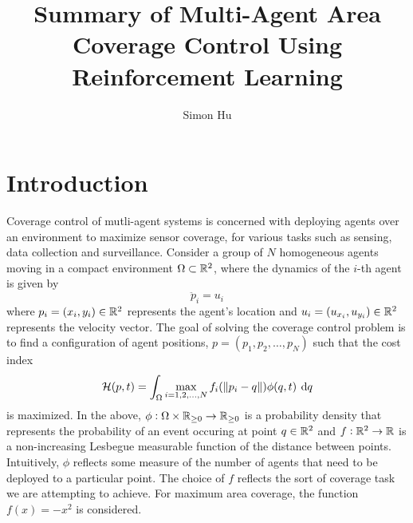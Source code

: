 \documentclass[11pt]{article}
\title{\bf\Large{Summary of Multi-Agent Area Coverage Control Using Reinforcement Learning}}
\author{Simon Hu}
\date{}
\begin{document}
\maketitle

\section{Introduction}
Coverage control of mutli-agent systems is concerned with deploying agents over an environment to maximize sensor coverage, for various tasks such as sensing, data collection and surveillance. Consider a group of $N$ homogeneous agents moving in a compact environment $\Omega \subset \mathbb{R}^2$, where the dynamics of the $i$-th agent is given by 
\begin{equation}
	\displaystyle \ddot{p}_i = u_i
\end{equation}
where $p_i = (x_i, y_i) \in \mathbb{R}^2$ represents the agent's location and $u_i = (u_{x_i}, u_{y_i}) \in \mathbb{R}^2$ represents the velocity vector. The goal of solving the coverage control problem is to find a configuration of agent positions, $p = (p_1, p_2, \dots, p_N)$ such that the cost index 
\begin{equation}
	\label{intro:cost index}
	\displaystyle \mathcal{H}(p,t) = \int_{\Omega}{\max\limits_{i=1,2,\dots,N}{f_i(\,\norm{p_i - q})} \phi(q, t) \: \dif q}
\end{equation}
is maximized. In the above, $\phi : \Omega \times \mathbb{R}_{\geq 0} \to \mathbb{R}_{\geq 0}$ is a probability density that represents the probability of an event occuring at point $q \in \mathbb{R}^2$ and $f : \mathbb{R}^2 \to \mathbb{R}$ is a non-increasing Lesbegue measurable function of the distance between points. Intuitively, $\phi$ reflects some measure of the number of agents that need to be deployed to a particular point. The choice of $f$ reflects the sort of coverage task we are attempting to achieve. For maximum area coverage, the function $f(x) = -x^2$ is considered.
\end{document}
